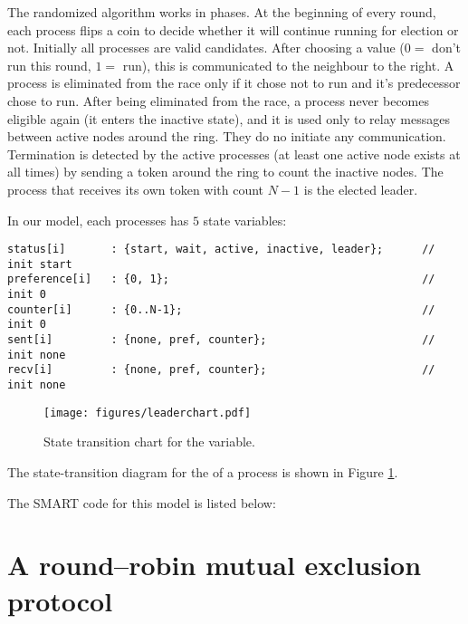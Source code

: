 The randomized algorithm works in phases. At the beginning of every round,
each process flips a coin to decide whether it will continue running for
election or not. Initially all processes are valid candidates. After
choosing a value ($0 = $ don't run this round, $1 = $ run), this is
communicated to the neighbour to the right. A process is eliminated from the
race only if it chose not to run and it's predecessor chose to run. After
being eliminated from the race, a process never becomes eligible again (it
enters the inactive state), and it is used only to relay messages between
active nodes around the ring. They do no initiate any communication.
Termination is detected by the active processes (at least one active node
exists at all times) by sending a token around the ring to count the
inactive nodes. The process that receives its own token with count $N-1$ is
the elected leader.

In our model, each processes has $5$ state variables:
\begin{lstlisting}
status[i]       : {start, wait, active, inactive, leader};      // init start
preference[i]   : {0, 1};                                       // init 0
counter[i]      : {0..N-1};                                     // init 0
sent[i]         : {none, pref, counter};                        // init none
recv[i]         : {none, pref, counter};                        // init none
\end{lstlisting}

\begin{figure}
  \centering
  \texttt{[image: figures/leaderchart.pdf]}
  \caption{State transition chart for the  variable.}
  \label{FIG:leaderchart}
\end{figure}

\noindent The state-transition diagram for the  of a process is
shown in Figure \ref{FIG:leaderchart}.


\noindent The SMART code for this model is listed below:
%

%



\section{A round--robin mutual exclusion protocol}

